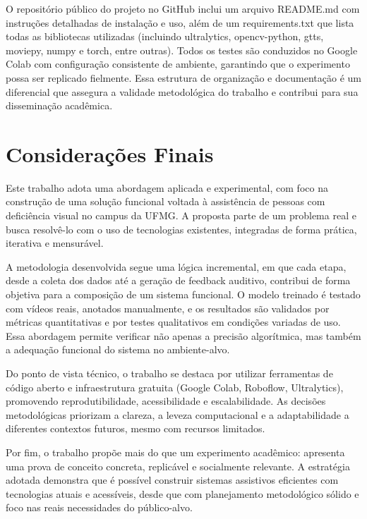 O repositório público do projeto no GitHub inclui um arquivo README.md com instruções detalhadas de instalação e uso, além de um requirements.txt que lista todas as bibliotecas utilizadas (incluindo ultralytics, opencv-python, gtts, moviepy, numpy e torch, entre outras). Todos os testes são conduzidos no Google Colab com configuração consistente de ambiente, garantindo que o experimento possa ser replicado fielmente. Essa estrutura de organização e documentação é um diferencial que assegura a validade metodológica do trabalho e contribui para sua disseminação acadêmica.

\section{Considerações Finais}

Este trabalho adota uma abordagem aplicada e experimental, com foco na construção de uma solução funcional voltada à assistência de pessoas com deficiência visual no campus da UFMG. A proposta parte de um problema real e busca resolvê-lo com o uso de tecnologias existentes, integradas de forma prática, iterativa e mensurável.

A metodologia desenvolvida segue uma lógica incremental, em que cada etapa, desde a coleta dos dados até a geração de feedback auditivo, contribui de forma objetiva para a composição de um sistema funcional. O modelo treinado é testado com vídeos reais, anotados manualmente, e os resultados são validados por métricas quantitativas e por testes qualitativos em condições variadas de uso. Essa abordagem permite verificar não apenas a precisão algorítmica, mas também a adequação funcional do sistema no ambiente-alvo.

Do ponto de vista técnico, o trabalho se destaca por utilizar ferramentas de código aberto e infraestrutura gratuita (Google Colab, Roboflow, Ultralytics), promovendo reprodutibilidade, acessibilidade e escalabilidade. As decisões metodológicas priorizam a clareza, a leveza computacional e a adaptabilidade a diferentes contextos futuros, mesmo com recursos limitados.

Por fim, o trabalho propõe mais do que um experimento acadêmico: apresenta uma prova de conceito concreta, replicável e socialmente relevante. A estratégia adotada demonstra que é possível construir sistemas assistivos eficientes com tecnologias atuais e acessíveis, desde que com planejamento metodológico sólido e foco nas reais necessidades do público-alvo.